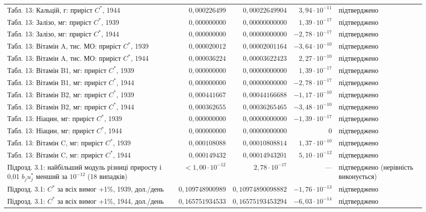 {\begin{longtable}{>{\raggedright}p{4.3cm}rrr>{\raggedright\arraybackslash}p{2.3cm}}
Табл. 13: Кальцій, г: приріст $C^*$, 1944 & $0{,}000226499$ & $0{,}00022649904$ & $3{,}94\cdot10^{-11}$ & підтверджено \\
Табл. 13: Залізо, мг: приріст $C^*$, 1939 & $0{,}000000000$ & $0{,}00000000000$ & $1{,}39\cdot10^{-17}$ & підтверджено \\
Табл. 13: Залізо, мг: приріст $C^*$, 1944 & $0{,}000000000$ & $0{,}00000000000$ & $-2{,}78\cdot10^{-17}$ & підтверджено \\
Табл. 13: Вітамін A, тис. МО: приріст $C^*$, 1939 & $0{,}000020012$ & $0{,}00002001164$ & $-3{,}64\cdot10^{-10}$ & підтверджено \\
Табл. 13: Вітамін A, тис. МО: приріст $C^*$, 1944 & $0{,}000036224$ & $0{,}00003622423$ & $2{,}27\cdot10^{-10}$ & підтверджено \\
Табл. 13: Вітамін B1, мг: приріст $C^*$, 1939 & $0{,}000000000$ & $0{,}00000000000$ & $1{,}39\cdot10^{-17}$ & підтверджено \\
Табл. 13: Вітамін B1, мг: приріст $C^*$, 1944 & $0{,}000000000$ & $0{,}00000000000$ & $-2{,}78\cdot10^{-17}$ & підтверджено \\
Табл. 13: Вітамін B2, мг: приріст $C^*$, 1939 & $0{,}000441667$ & $0{,}00044166688$ & $-1{,}17\cdot10^{-10}$ & підтверджено \\
Табл. 13: Вітамін B2, мг: приріст $C^*$, 1944 & $0{,}000362655$ & $0{,}00036265465$ & $-3{,}48\cdot10^{-10}$ & підтверджено \\
Табл. 13: Ніацин, мг: приріст $C^*$, 1939 & $0{,}000000000$ & $0{,}00000000000$ & $-1{,}39\cdot10^{-17}$ & підтверджено \\
Табл. 13: Ніацин, мг: приріст $C^*$, 1944 & $0{,}000000000$ & $0{,}00000000000$ & $0$ & підтверджено \\
Табл. 13: Вітамін C, мг: приріст $C^*$, 1939 & $0{,}000108088$ & $0{,}00010808814$ & $1{,}37\cdot10^{-10}$ & підтверджено \\
Табл. 13: Вітамін C, мг: приріст $C^*$, 1944 & $0{,}000149432$ & $0{,}00014943201$ & $5{,}10\cdot10^{-12}$ & підтверджено \\
Підрозд. 3.1: найбільший модуль різниці приросту і 0{,}01 $b_ju_j^*$ менший за $10^{-12}$ (18 випадків) & $<1{,}00\cdot10^{-12}$ & $2{,}78\cdot10^{-17}$ & --- & підтверджено (нерівність виконується) \\
Підрозд. 3.1: $C^*$ за всіх вимог +1\%, 1939, дол./день & $0{,}109748900989$ & $0{,}10974890098882$ & $-1{,}76\cdot10^{-13}$ & підтверджено \\
Підрозд. 3.1: $C^*$ за всіх вимог +1\%, 1944, дол./день & $0{,}165751934533$ & $0{,}16575193453294$ & $-6{,}03\cdot10^{-14}$ & підтверджено \\
\end{longtable}}
